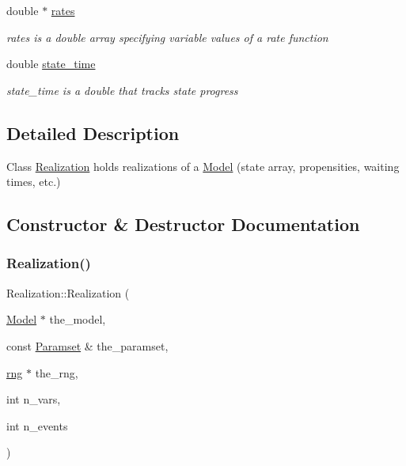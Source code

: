 \begin{DoxyCompactItemize}
double $\ast$ \hyperlink{class_realization_a9c52d8c6aa0ad99dbbec1e98302db7d8}{rates}
\begin{DoxyCompactList}\small\item\em rates is a double array specifying variable values of a rate function \end{DoxyCompactList}\item 
\mbox{\label{class_realization_a7c4def45c4833072317517b71e723793}} 
double \hyperlink{class_realization_a7c4def45c4833072317517b71e723793}{state\+\_\+time}
\begin{DoxyCompactList}\small\item\em state\+\_\+time is a double that tracks state progress \end{DoxyCompactList}\end{DoxyCompactItemize}


\subsection{Detailed Description}
Class \hyperlink{class_realization}{Realization} holds realizations of a \hyperlink{class_model}{Model} (state array, propensities, waiting times, etc.) 

\subsection{Constructor \& Destructor Documentation}
\mbox{\label{class_realization_af4cfb6f2221bef9ba5ad09564796677f}} 
\subsubsection{\texorpdfstring{Realization()}{Realization()}}
{\footnotesize\ttfamily Realization\+::\+Realization (\begin{DoxyParamCaption}\item[{\hyperlink{class_model}{Model} $\ast$}]{the\+\_\+model,  }\item[{const \hyperlink{class_paramset}{Paramset} \&}]{the\+\_\+paramset,  }\item[{\hyperlink{classrng}{rng} $\ast$}]{the\+\_\+rng,  }\item[{int}]{n\+\_\+vars,  }\item[{int}]{n\+\_\+events }\end{DoxyParamCaption})}



